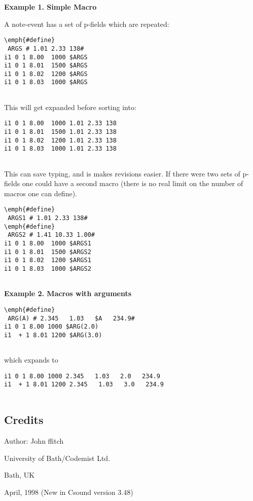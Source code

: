  


 \textbf{Example 1. Simple Macro}



  A note-event has a set of p-fields which are repeated: \begin{lstlisting}
\emph{#define}
 ARGS # 1.01 2.33 138#
i1 0 1 8.00  1000 $ARGS
i1 0 1 8.01  1500 $ARGS
i1 0 1 8.02  1200 $ARGS
i1 0 1 8.03  1000 $ARGS
          
\end{lstlisting}
 This will get expanded before sorting into: \begin{lstlisting}
i1 0 1 8.00  1000 1.01 2.33 138
i1 0 1 8.01  1500 1.01 2.33 138
i1 0 1 8.02  1200 1.01 2.33 138
i1 0 1 8.03  1000 1.01 2.33 138
          
\end{lstlisting}



  This can save typing, and is makes revisions easier. If there were two sets of p-fields one could have a second macro (there is no real limit on the number of macros one can define). 


 
\begin{lstlisting}
\emph{#define}
 ARGS1 # 1.01 2.33 138#
\emph{#define}
 ARGS2 # 1.41 10.33 1.00#
i1 0 1 8.00  1000 $ARGS1
i1 0 1 8.01  1500 $ARGS2
i1 0 1 8.02  1200 $ARGS1
i1 0 1 8.03  1000 $ARGS2
        
\end{lstlisting}


 


 


 \textbf{Example 2. Macros with arguments}



 


 
\begin{lstlisting}
\emph{#define}
 ARG(A) # 2.345   1.03   $A   234.9#
i1 0 1 8.00 1000 $ARG(2.0)
i1  + 1 8.01 1200 $ARG(3.0)
            
\end{lstlisting}


 
 which expands to 

 
\begin{lstlisting}
i1 0 1 8.00 1000 2.345   1.03   2.0   234.9
i1  + 1 8.01 1200 2.345   1.03   3.0   234.9
            
\end{lstlisting}


 
\subsection*{Credits}


 Author: John ffitch


 University of Bath/Codemist Ltd.


 Bath, UK


 April, 1998 (New in Csound version 3.48)


\begin{comment}
\begin{tabular}{lcr}
Previous &Home &Next \\
Ramping &Up &Multiple File Score

\end{tabular}



\end{comment}
